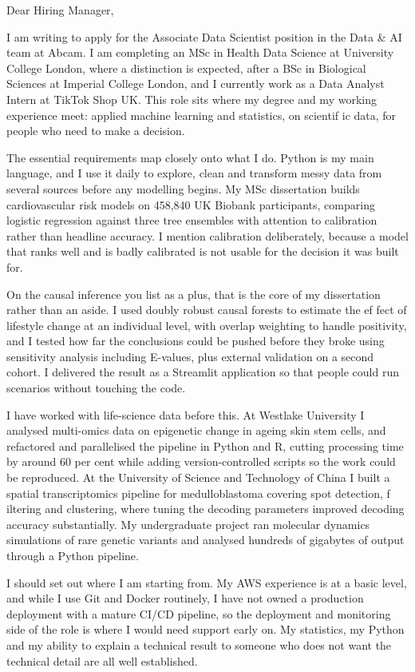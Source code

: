 \documentclass[letterpaper,11pt]{article}
\begin{document}
Dear Hiring Manager,

I am writing to apply for the Associate Data Scientist position in the Data \& AI team at Abcam. I am completing an MSc in Health Data Science at University College London, where a distinction is expected, after a BSc in Biological Sciences at Imperial College London, and I currently work as a Data Analyst Intern at TikTok Shop UK. This role sits where my degree and my working experience meet: applied machine learning and statistics, on scientif\kern0pt ic data, for people who need to make a decision.

The essential requirements map closely onto what I do. Python is my main language, and I use it daily to explore, clean and transform messy data from several sources before any modelling begins. My MSc dissertation builds cardiovascular risk models on 458,840 UK Biobank participants, comparing logistic regression against three tree ensembles with attention to calibration rather than headline accuracy. I mention calibration deliberately, because a model that ranks well and is badly calibrated is not usable for the decision it was built for.

On the causal inference you list as a plus, that is the core of my dissertation rather than an aside. I used doubly robust causal forests to estimate the ef\kern0pt fect of lifestyle change at an individual level, with overlap weighting to handle positivity, and I tested how far the conclusions could be pushed before they broke using sensitivity analysis including E-values, plus external validation on a second cohort. I delivered the result as a Streamlit application so that people could run scenarios without touching the code.

I have worked with life-science data before this. At Westlake University I analysed multi-omics data on epigenetic change in ageing skin stem cells, and refactored and parallelised the pipeline in Python and R, cutting processing time by around 60 per cent while adding version-controlled scripts so the work could be reproduced. At the University of Science and Technology of China I built a spatial transcriptomics pipeline for medulloblastoma covering spot detection, f\kern0pt iltering and clustering, where tuning the decoding parameters improved decoding accuracy substantially. My undergraduate project ran molecular dynamics simulations of rare genetic variants and analysed hundreds of gigabytes of output through a Python pipeline.

I should set out where I am starting from. My AWS experience is at a basic level, and while I use Git and Docker routinely, I have not owned a production deployment with a mature CI/CD pipeline, so the deployment and monitoring side of the role is where I would need support early on. My statistics, my Python and my ability to explain a technical result to someone who does not want the technical detail are all well established.
\end{document}
